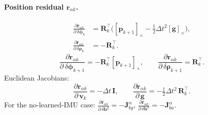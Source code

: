 \paragraph{Position residual $\mathbf{r}_{\alpha k}$.}
\begin{equation}
\begin{aligned}
\frac{\partial \mathbf{r}_{\alpha k}}{\partial\,\delta\boldsymbol{\phi}_k}
&=
\mathbf{R}_k^\top\Big([\mathbf{p}_{k+1}]_\times-\tfrac12\Delta t^2[\mathbf{g}]_\times\Big),\\
\frac{\partial \mathbf{r}_{\alpha k}}{\partial\,\delta\boldsymbol{\rho}_k}
&=
-\mathbf{R}_k^\top.
\end{aligned}
\end{equation}
\begin{equation}
\frac{\partial \mathbf{r}_{\alpha k}}{\partial\,\delta\boldsymbol{\phi}_{k+1}}
=
-\mathbf{R}_k^\top[\mathbf{p}_{k+1}]_\times,
\qquad
\frac{\partial \mathbf{r}_{\alpha k}}{\partial\,\delta\boldsymbol{\rho}_{k+1}}
=
\mathbf{R}_k^\top.
\end{equation}
Euclidean Jacobians:
\begin{equation}
\frac{\partial \mathbf{r}_{\alpha k}}{\partial\,\mathbf{v}_k}=-\Delta t\,\mathbf{I},
\qquad
\frac{\partial \mathbf{r}_{\alpha k}}{\partial\,\mathbf{g}}=-\tfrac12\Delta t^2\,\mathbf{R}_k^\top.
\end{equation}
For the no-learned-IMU case:
$\frac{\partial \mathbf{r}_{\alpha k}}{\partial\,\delta\mathbf{b}^g}=-\mathbf{J}_{bg}^\alpha$,
$\frac{\partial \mathbf{r}_{\alpha k}}{\partial\,\delta\mathbf{b}^a}=-\mathbf{J}_{ba}^\alpha$.


